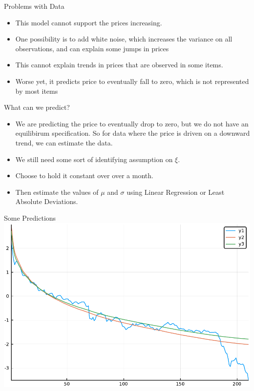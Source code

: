 \documentclass[bigger]{beamer}
\begin{document}
\begin{frame}[label=sec-1-14]{Problems with Data}
\begin{itemize}
\item This model cannot support the prices increasing.
\item One possibility is to add white noise, which increases the variance
on all observations, and can explain some jumps in prices
\item This cannot explain trends in prices that are observed in some items.
\item Worse yet, it predicts price to eventually fall to zero, which is
not represented by most items
\end{itemize}
\end{frame}

\begin{frame}[label=sec-1-15]{What can we predict?}
\begin{itemize}
\item We are predicting the price to eventually drop to zero, but we do
not have an equilibirum specification. So for data where the price
is driven on a downward trend, we can estimate the data.
\item We still need some sort of identifying assumption on $\xi$.
\item Choose to hold it constant over over a month.
\item Then estimate the values of $\mu$ and $\sigma$ using Linear Regression or Least
Absolute Deviations.
\end{itemize}
\end{frame}

\begin{frame}[label=sec-1-16]{Some Predictions}
\includegraphics[width=.9\linewidth]{../Plots/Cases/NoGrowth/Spectrum Case.pdf}
\end{frame}
\end{document}

